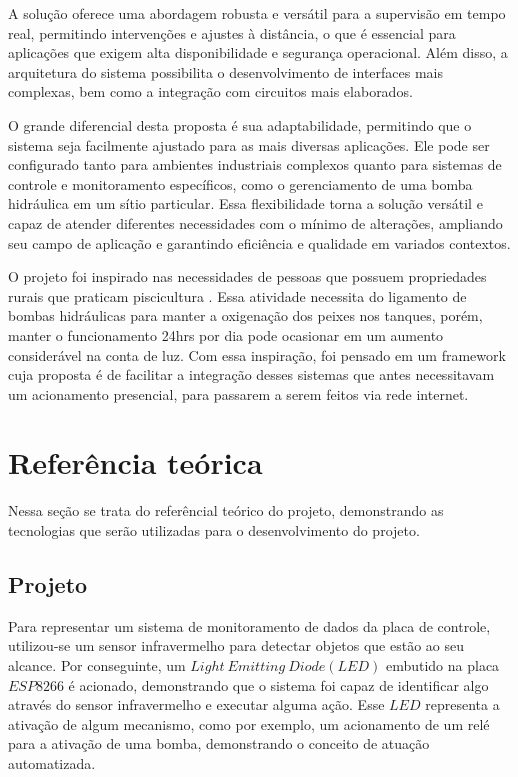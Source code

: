 \documentclass{ecatfg}
\begin{document}
A solução oferece uma abordagem robusta e versátil para a supervisão em tempo real, permitindo intervenções e ajustes à distância, o que é essencial para aplicações que exigem alta disponibilidade e segurança operacional. Além disso, a arquitetura do sistema possibilita o desenvolvimento de interfaces mais complexas, bem como a integração com circuitos mais elaborados.\par

O grande diferencial desta proposta é sua adaptabilidade, permitindo que o sistema seja facilmente ajustado para as mais diversas aplicações. Ele pode ser configurado tanto para ambientes industriais complexos quanto para sistemas de controle e monitoramento específicos, como o gerenciamento de uma bomba hidráulica em um sítio particular. Essa flexibilidade torna a solução versátil e capaz de atender diferentes necessidades com o mínimo de alterações, ampliando seu campo de aplicação e garantindo eficiência e qualidade em variados contextos.\par

O projeto foi inspirado nas necessidades de pessoas que possuem propriedades rurais que praticam piscicultura \cite{pisicultura}. Essa atividade necessita do ligamento de bombas hidráulicas para manter a oxigenação dos peixes nos tanques, porém, manter o funcionamento 24hrs por dia pode ocasionar em um aumento considerável na conta de luz. Com essa inspiração, foi pensado em um framework cuja proposta é de facilitar a integração desses sistemas que antes necessitavam um acionamento presencial, para passarem a serem feitos via rede internet. \par

\section{Referência teórica}

Nessa seção se trata do referêncial teórico do projeto, demonstrando as tecnologias que serão utilizadas para o desenvolvimento do projeto.\par

\subsection{Projeto}
\label{SeçãoIII1}

Para representar um sistema de monitoramento de dados da placa de controle, utilizou-se um sensor infravermelho \cite{sensor_ir} para detectar objetos que estão ao seu alcance. Por conseguinte, um $Light\ Emitting\ Diode(LED)$ \cite{led} embutido na placa $ESP8266$ \cite{esp8266} é acionado, demonstrando que o sistema foi capaz de identificar algo através do sensor infravermelho e executar alguma ação. Esse $LED$ representa a ativação de algum mecanismo, como por exemplo, um acionamento de um relé para a ativação de uma bomba, demonstrando o conceito de atuação automatizada.\par
\end{document}
